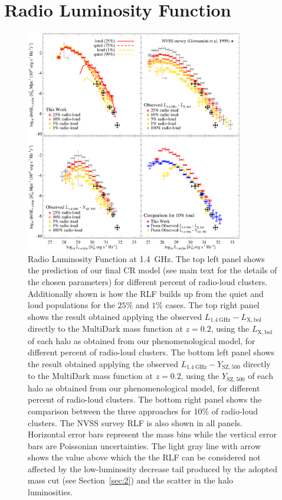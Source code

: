\documentclass[traditabstract]{aa}
\newcommand{\rmn}{\mathrm}
\begin{document}
\section{Radio Luminosity Function}
\label{sec:5}

\begin{figure}[t]
\centering
\includegraphics[width=0.85\textwidth]{figures/RLFs_1.4.eps}
\caption{Radio Luminosity Function at 1.4~GHz. The top left panel shows the prediction of our final CR model (see main text for the details of the chosen parameters) for different percent of radio-loud clusters. Additionally shown is how the RLF builds up from the quiet and loud populations for the $25\%$ and $1\%$ cases. The top right panel shows the result obtained applying the observed $L_{1.4~\rmn{GHz}}-L_{\rmn{X,bol}}$ directly to the MultiDark mass function at  $z = 0.2$, using the $L_{\rmn{X,bol}}$ of each halo as obtained from our phenomenological model, for different percent of radio-loud clusters. The bottom left panel shows the result obtained applying the observed $L_{1.4~\rmn{GHz}}-Y_{\rmn{SZ}, 500}$ directly to the MultiDark mass function at  $z = 0.2$, using the $Y_{\rmn{SZ}, 500}$ of each halo as obtained from our phenomenological model, for different percent of radio-loud clusters. The bottom right panel shows the comparison between the three approaches for 10\% of radio-loud clusters. The NVSS survey RLF \citep{1999NewA....4..141G} is also shown in all panels. Horizontal error bars represent the mass bins while the vertical error bars are Poissonian uncertainties. The light gray line with arrow shows the value above which the the RLF can be considered not affected by the low-luminosity decrease tail produced by the adopted mass cut (see Section~\ref{sec:2}) and the scatter in the halo luminosities.}
\label{fig:RLF_1.4}
\end{figure}
\end{document}
